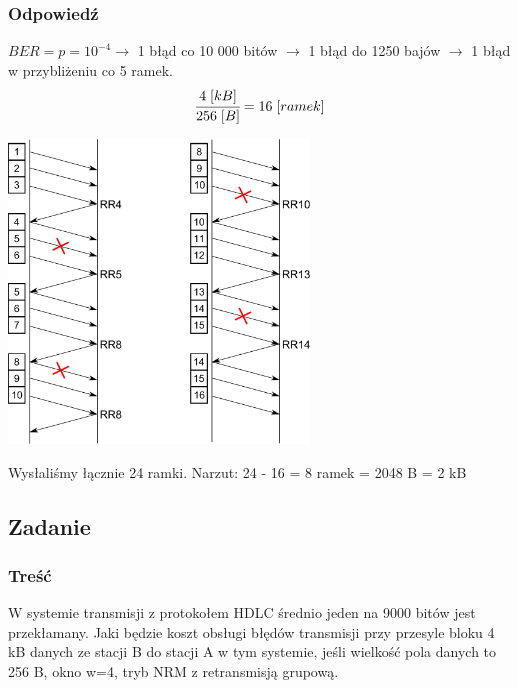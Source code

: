 		\subsubsection{Odpowiedź}
			$ BER=p=10^{-4} \rightarrow$ 1 błąd co 10 000 bitów $ \rightarrow $ 1 błąd do 1250 bajów $ \rightarrow $ 1 błąd w przybliżeniu co 5 ramek.\\
			$$ \cfrac{4\;[kB]}{256\;[B]}=16\;[ramek] $$
			\begin{center}
				\includegraphics[width=8.0cm]{./images/zadanie10.pdf}
			\end{center}
			Wysłaliśmy łącznie 24 ramki. Narzut: 24 - 16 = 8 ramek = 2048 B = 2 kB
\newpage
	\subsection{Zadanie}
		\subsubsection{Treść}
			W systemie transmisji z protokołem HDLC średnio jeden na 9000 bitów jest przekłamany. Jaki będzie koszt obsługi błędów transmisji przy przesyle bloku 4 kB danych ze stacji B do stacji A w tym systemie, jeśli wielkość pola danych to 256 B, okno w=4, tryb NRM z retransmisją grupową.
